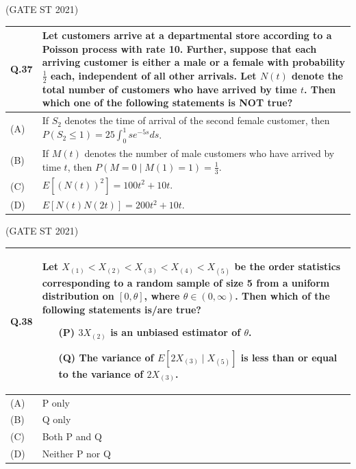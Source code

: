 \documentclass[journal,12pt,onecolumn]{IEEEtran}
\theoremstyle{remark}
\begin{document}
\bigskip
\hfill (GATE ST 2021)
\\
\begin{tabular}{|p{1cm}|p{14cm}|}
\hline
\textbf{Q.37} &
Let customers arrive at a departmental store according to a Poisson process with rate 10. Further, suppose that each arriving customer is either a male or a female with probability $\frac{1}{2}$ each, independent of all other arrivals. Let $N(t)$ denote the total number of customers who have arrived by time $t$. Then which one of the following statements is NOT true?\\
\hline

(A) & If $S_2$ denotes the time of arrival of the second female customer, then $P(S_2 \leq 1) = 25 \int_0^1 s e^{-5 s} ds$.\\
\hline
(B) & If $M(t)$ denotes the number of male customers who have arrived by time $t$, then $P(M = 0 \mid M(1) = 1) = \frac{1}{3}$.\\
\hline
(C) & $E[(N(t))^2] = 100 t^2 + 10 t$.\\
\hline
(D) & $E[N(t) N(2t)] = 200 t^2 + 10 t$.\\
\hline
\end{tabular}

\bigskip
\hfill (GATE ST 2021)
\\
\begin{tabular}{|p{1cm}|p{14cm}|}
\hline
\textbf{Q.38} &
Let $X_{(1)} < X_{(2)} < X_{(3)} < X_{(4)} < X_{(5)}$ be the order statistics corresponding to a random sample of size 5 from a uniform distribution on $[0,\theta]$, where $\theta \in (0, \infty)$. Then which of the following statements is/are true?

\begin{itemize}
\item[(P)] $3 X_{(2)}$ is an unbiased estimator of $\theta$.
\item[(Q)] The variance of $E[2 X_{(3)} \mid X_{(5)}]$ is less than or equal to the variance of $2 X_{(3)}$.
\end{itemize}\\
\hline
(A) & P only\\
\hline
(B) &  Q only\\
\hline
(C) & Both P and Q\\
\hline
(D) & Neither P nor Q\\
\hline
\end{tabular}
\end{document}
